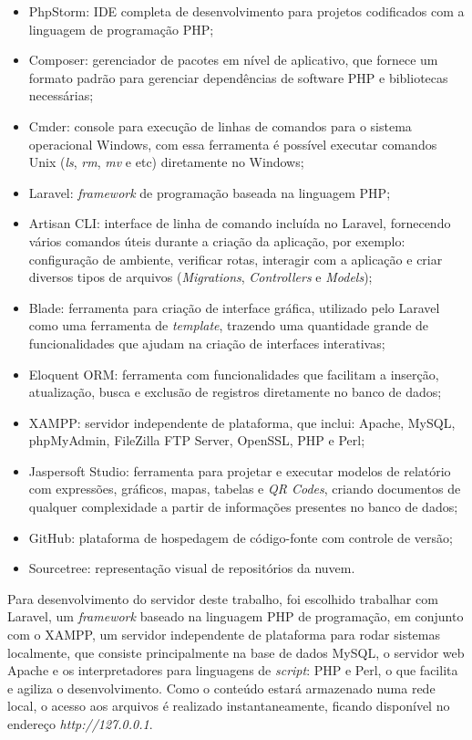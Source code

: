 \begin{itemize}
    \item PhpStorm: IDE completa de desenvolvimento para projetos codificados com a linguagem de programação PHP;
    \item Composer: gerenciador de pacotes em nível de aplicativo, que fornece um formato padrão para gerenciar dependências de software PHP e bibliotecas necessárias;
    \item Cmder: console para execução de linhas de comandos para o sistema operacional Windows, com essa ferramenta é possível executar comandos Unix (\textit{ls}, \textit{rm}, \textit{mv} e etc) diretamente no Windows;
    \item Laravel: \textit{framework} de programação baseada na linguagem PHP;
    \item Artisan CLI: interface de linha de comando incluída no Laravel, fornecendo vários comandos úteis durante a criação da aplicação, por exemplo: configuração de ambiente, verificar rotas, interagir com a aplicação e criar diversos tipos de arquivos (\textit{Migrations}, \textit{Controllers} e \textit{Models});
    \item Blade: ferramenta para criação de interface gráfica, utilizado pelo Laravel como uma ferramenta de \textit{template}, trazendo uma quantidade grande de funcionalidades que ajudam na criação de interfaces interativas;
    \item Eloquent ORM: ferramenta com funcionalidades que facilitam a inserção, atualização, busca e exclusão de registros diretamente no banco de dados;
    \item XAMPP: servidor independente de plataforma, que inclui: Apache, MySQL, phpMyAdmin, FileZilla FTP Server, OpenSSL, PHP e Perl;
    \item Jaspersoft Studio: ferramenta para projetar e executar modelos de relatório com  expressões, gráficos, mapas, tabelas e \textit{QR Codes}, criando documentos de qualquer complexidade a partir de informações presentes no banco de dados;
    \item GitHub: plataforma de hospedagem de código-fonte com controle de versão;
    \item Sourcetree: representação visual de repositórios da nuvem.
\end{itemize}

\newpage
Para desenvolvimento do servidor deste trabalho, foi escolhido trabalhar com Laravel, um \textit{framework} baseado na linguagem PHP de programação, em conjunto com o XAMPP, um servidor independente de plataforma para rodar sistemas localmente, que consiste principalmente na base de dados MySQL, o servidor web Apache e os interpretadores para linguagens de \textit{script}: PHP e Perl, o que facilita e agiliza o desenvolvimento. Como o conteúdo estará armazenado numa rede local, o acesso aos arquivos é realizado instantaneamente, ficando disponível no endereço \textit{http://127.0.0.1}.

